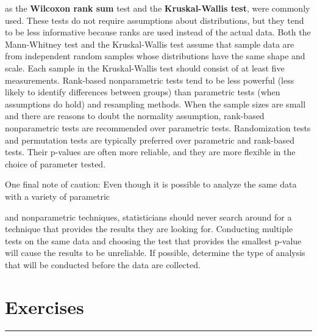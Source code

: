 \documentclass[
]{report}
\let\theexcount\relax
\begin{document}
as the \textbf{Wilcoxon rank sum} test and the \textbf{Kruskal-Wallis test}, were commonly used. These tests do not
require assumptions about distributions, but they tend to be less informative because ranks are used instead
of the actual data. Both the Mann-Whitney test and the Kruskal-Wallis test assume that sample data are
from independent random samples whose distributions have the same shape and scale. Each sample in the
Kruskal-Wallis test should consist of at least five measurements. Rank-based nonparametric tests tend to be
less powerful (less likely to identify differences between groups) than parametric tests (when assumptions do
hold) and resampling methods. When the sample sizes are small and there are reasons to doubt the normality
assumption, rank-based nonparametric tests are recommended over parametric tests. Randomization tests and
permutation tests are typically preferred over parametric and rank-based tests. Their p-values are often more
reliable, and they are more flexible in the choice of parameter tested.

One final note of caution: Even though it is possible to analyze the same data with a variety of parametric

and nonparametric techniques, statisticians should never search around for a technique that provides the
results they are looking for. Conducting multiple tests on the same data and choosing the test that provides
the smallest p-value will cause the results to be unreliable. If possible, determine the type of analysis that will
be conducted before the data are collected.

\section*{\texorpdfstring{\textbf{Exercises}}{Exercises}}\label{exercises}

\vspace{-2em}

\noindent

\rule{\linewidth}{0.4pt}

\renewcommand{\theexcount}{E\arabic{excount}}
\end{document}
